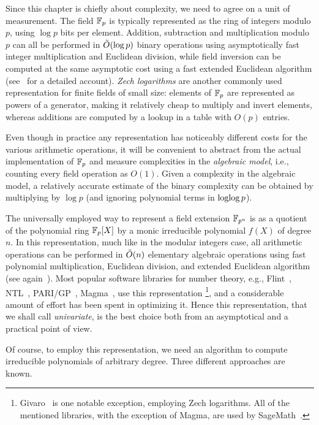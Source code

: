\documentclass[b5layout]{hdr}
\begin{document}
Since this chapter is chiefly about complexity, we need to agree on a
unit of measurement. %
The field $\mathbb{F}_p$ is typically represented as the ring of integers
modulo $p$, using $\log p$ bits per element. %
Addition, subtraction and multiplication modulo $p$ can all be
performed in $\tilde{O}(\log p)$ binary operations using asymptotically
fast integer multiplication and Euclidean division, while field
inversion can be computed at the same asymptotic cost using a fast
extended Euclidean algorithm (see~\cite{vzGG} for a detailed
account). %
\emph{Zech logarithms} are another commonly used representation for
finite fields of small size: elements of $\mathbb{F}_p$ are represented as
powers of a generator, making it relatively cheap to multiply and
invert elements, whereas additions are computed by a lookup in a table
with $O(p)$ entries. %

Even though in practice any representation has noticeably different
costs for the various arithmetic operations, it will be convenient to
abstract from the actual implementation of $\mathbb{F}_p$ and measure
complexities in the \emph{algebraic model}, i.e., counting every field
operation as $O(1)$. %
Given a complexity in the algebraic model, a relatively accurate
estimate of the binary complexity can be obtained by multiplying by
$\log p$ (and ignoring polynomial terms in $\operatorname{loglog} p$). %

The universally employed way to represent a field extension $\mathbb{F}_{p^n}$
is as a quotient of the polynomial ring $\mathbb{F}_p[X]$ by a monic
irreducible polynomial $f(X)$ of degree $n$. %
In this representation, much like in the modular integers case, all
arithmetic operations can be performed in $\tilde{O}(n)$ elementary
algebraic operations using fast polynomial multiplication, Euclidean
division, and extended Euclidean algorithm (see again~\cite{vzGG}). %
Most popular software libraries for number theory, e.g.,
Flint~\cite{Hart2010}, NTL~\cite{shoup2003ntl}, PARI/GP~\cite{Pari},
Magma~\cite{MAGMA}, use this representation%
\footnote{Givaro~\cite{givaro} is one notable exception, employing
  Zech logarithms. %
  All of the mentioned libraries, with the exception of Magma, are
  used by SageMath~\cite{Sage}.}, %
and a considerable amount of effort has been spent in optimizing it. %
Hence this representation, that we shall call \emph{univariate}, is
the best choice both from an asymptotical and a practical point of
view. %

Of course, to employ this representation, we need an algorithm to
compute irreducible polynomials of arbitrary degree. %
Three different approaches are known. %
\end{document}
